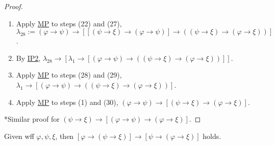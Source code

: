 \documentclass{treatise}
\begin{document}
\begin{proof}
\begin{enumerate}
    \item Apply \hyperref[HPL-R-MP]{MP} to steps (22) and (27), $\lambda_{28} := (\varphi \to \psi) \to [[(\psi \to \xi) \to (\varphi \to \psi)] \to ((\psi \to \xi) \to (\varphi \to \xi))]$.
    \\
    \item By \hyperref[HPL-A-IP2]{IP2}, $\lambda_{28} \to [\lambda_1 \to [(\varphi \to \psi) \to ((\psi \to \xi) \to (\varphi \to \xi))]]$.
    \item Apply \hyperref[HPL-R-MP]{MP} to steps (28) and (29), $\lambda_1 \to [(\varphi \to \psi) \to ((\psi \to \xi) \to (\varphi \to \xi))]$.
    \item Apply \hyperref[HPL-R-MP]{MP} to steps (1) and (30), $(\varphi \to \psi) \to [(\psi \to \xi) \to (\varphi \to \xi)]$.
\end{enumerate}
*Similar proof for $(\psi \to \xi) \to [(\varphi \to \psi) \to (\varphi \to \xi)]$.
\end{proof}
\begin{proposition} \label{HPL-T-AS}
Given wff $\varphi, \psi, \xi$, then $[\varphi \to (\psi \to \xi)] \to [\psi \to (\varphi \to \xi)]$ holds.
\end{proposition}
\end{document}

